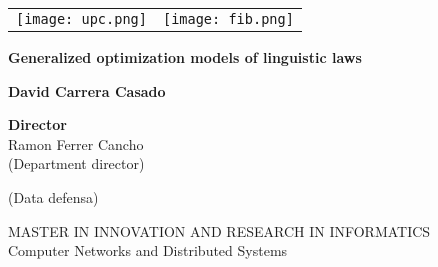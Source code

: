 \begin{titlepage}
  \tiny
  \vspace*{-3cm}
  \hspace*{-3cm}
  \begin{tabular}{lr}
    \texttt{[image: upc.png]} & \texttt{[image: fib.png]}  \\
  \end{tabular}
  \begin{center}
    \vspace{4cm}
    
    \Huge
    \textbf{Generalized optimization models of linguistic laws}
    
    \vspace{0.5cm}
    \LARGE
    
    \vspace{1.5cm}
    
    \textbf{David Carrera Casado}
    
    \vfill
    
    \Large
    \textbf{Director}\\
    Ramon Ferrer Cancho\\
    (Department director)\\

    \vspace{0.5cm}
    
    (Data defensa)
    
    \vspace{1.5cm}

    \normalsize
    MASTER IN INNOVATION AND RESEARCH IN INFORMATICS\\
    Computer Networks and Distributed Systems
  \end{center}
\end{titlepage}

